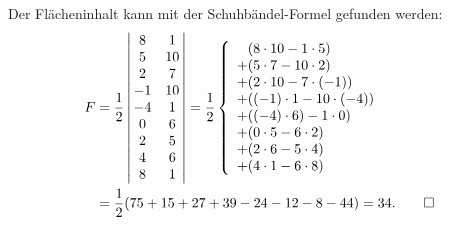 
\begin{loesung}
Der Flächeninhalt kann mit der Schuhbändel-Formel gefunden werden:
\begin{align*}
F&=\frac12\left|\,\begin{matrix}
8&1\\
5&10\\
2&7\\
-1&10\\
-4&1\\
0&6\\
2&5\\
4&6\\
8&1
\end{matrix}\,\right|
=
\frac12
\left\{
\begin{array}{l}
\phantom{+} (8\cdot 10 - 1\cdot 5)
\\
+ (5\cdot 7-10\cdot 2)
\\
+ (2\cdot10 -7\cdot (-1))
\\
+ ((-1)\cdot 1-10\cdot(-4))
\\
+((-4)\cdot 6)-1\cdot 0)
\\
+(0\cdot 5-6\cdot 2)
\\
+(2\cdot 6-5\cdot 4)
\\
+(4\cdot 1-6\cdot8)
\end{array}
\right.
\\
&=
\frac12(
75 +15 +27 +39 -24 -12 -8 -44)
=34.
\qedhere
\end{align*}
\end{loesung}

